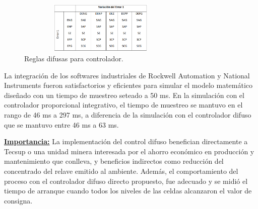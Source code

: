 \documentclass[10pt,conference]{IEEEtran}
\begin{document}
\begin{enumerate}
    \begin{figure}[H]
    \begin{center}
    \includegraphics[width=8cm,height=2.5cm]{figuras/AA5.PNG}
    \caption{Reglas difusas para controlador.}
    \label{AA5} 
    \end{center}
    \end{figure}


    
La integración de los softwares industriales de Rockwell Automation y National
Instruments fueron satisfactorios y eficientes para simular el modelo matemático
diseñado con un tiempo de muestreo seteado a 50 ms. En la simulación con el
controlador proporcional integrativo, el tiempo de muestreo se mantuvo en el rango
de 46 ms a 297 ms, a diferencia de la simulación con el controlador difuso que se
mantuvo entre 46 ms a 63 ms.

\textbf{\underline{Importancia:}} 
La implementación del control difuso benefician directamente a Tecsup o
una unidad minera interesada por el ahorro económico en producción y mantenimiento que
conlleva, y beneficios indirectos como reducción del concentrado del relave emitido al
ambiente. Además, el comportamiento del proceso con el controlador difuso directo propuesto, fue adecuado y se midió el tiempo de arranque cuando todos los niveles de las celdas alcanzaron el valor de consigna. 


\end{enumerate}
\end{document}
